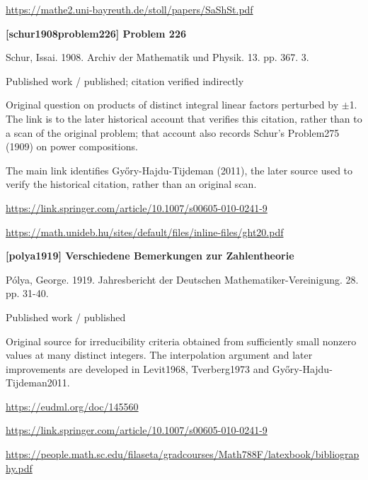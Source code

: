 \documentclass[11pt,a4paper,oneside,openany]{book}
\begin{document}
{\footnotesize\url{https://mathe2.uni-bayreuth.de/stoll/papers/SaShSt.pdf}}\par
\vspace{9pt}
\hypertarget{ref:schur1908problem226}{}
{\sffamily\bfseries\color{atlasgreen}[schur1908problem226] Problem 226}\par
\color{black} Schur, Issai. 1908. Archiv der Mathematik und Physik. 13. pp. 367. 3.\par
{\small\sffamily\color{atlasgold}Published work / published; citation verified indirectly}\par
\color{black} Original question on products of distinct integral linear factors perturbed by \ensuremath{\pm}1. The link is to the later historical account that verifies this citation, rather than to a scan of the original problem; that account also records Schur's Problem275 (1909) on power compositions.\par
{\small The main link identifies Győry-Hajdu-Tijdeman (2011), the later source used to verify the historical citation, rather than an original scan.}\par
{\footnotesize\url{https://link.springer.com/article/10.1007/s00605-010-0241-9}}\par
{\footnotesize\url{https://math.unideb.hu/sites/default/files/inline-files/ght20.pdf}}\par
\vspace{9pt}
\hypertarget{ref:polya1919}{}
{\sffamily\bfseries\color{atlasgreen}[polya1919] Verschiedene Bemerkungen zur Zahlentheorie}\par
\color{black} Pólya, George. 1919. Jahresbericht der Deutschen Mathematiker-Vereinigung. 28. pp. 31-40.\par
{\small\sffamily\color{atlasgold}Published work / published}\par
\color{black} Original source for irreducibility criteria obtained from sufficiently small nonzero values at many distinct integers. The interpolation argument and later improvements are developed in Levit1968, Tverberg1973 and Győry-Hajdu-Tijdeman2011.\par
{\footnotesize\url{https://eudml.org/doc/145560}}\par
{\footnotesize\url{https://link.springer.com/article/10.1007/s00605-010-0241-9}}\par
{\footnotesize\url{https://people.math.sc.edu/filaseta/gradcourses/Math788F/latexbook/bibliography.pdf}}\par
\vspace{9pt}
\end{document}
